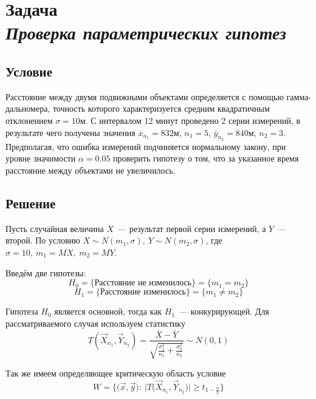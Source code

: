 \section*{Задача \\\textit{Проверка параметрических гипотез}}

\subsection*{Условие}
Расстояние между двумя подвижными объектами определяется с помощью гамма-дальномера, точность которого характеризуется средним квадратичным отклонением $\sigma = 10$м. С интервалом 12 минут проведено 2 серии измерений, в результате чего получены значения $\overline{x}_{n_1} = 832$м, $n_1 = 5$, $\overline{y}_{n_2} = 840$м, $n_2 = 3$. Предполагая, что ошибка измерений подчиняется нормальному закону, при уровне значимости $\alpha = 0.05$ проверить гипотезу о том, что за указанное время расстояние между объектами не увеличилось.

\subsection*{Решение}
Пусть случайная величина $X$~--- результат первой серии измерений, а $Y$~--- второй. По условию $X \sim N(m_1, \sigma),\ Y \sim N(m_2, \sigma)$, где $\sigma = 10,\ m_1 = MX,\ m_2 = MY$.

Введём две гипотезы:
\begin{equation*}
    H_0 = \big\{\text{Расстояние не изменилось}\big\} = \big\{m_1 = m_2\big\}
\end{equation*}
\begin{equation*}
    H_1 = \big\{\text{Расстояние изменилось}\big\} = \big\{m_1 \ne m_2\big\}
\end{equation*}

Гипотеза $H_0$ является основной, тогда как $H_1$~--- конкурирующей. Для рассматриваемого случая используем статистику
\begin{equation*}
    T(\overrightarrow{X}_{n_1}, \overrightarrow{Y}_{n_2}) = \frac{\overline{X} - \overline{Y}}{\sqrt{\frac{\sigma_1^2}{n_1} + \frac{\sigma_2^2}{n_2}}} \sim N(0, 1)
\end{equation*}

Так же имеем определяющее критическую область условие
\begin{equation*}
    W = \Big\{\big(\vec x, \vec y\big):\ \Big|T\big(\overrightarrow{X}_{n_1}, \overrightarrow{Y}_{n_2}\big)\Big| \geqslant t_{1 - \frac{\alpha}{2}}\Big\}
\end{equation*}

